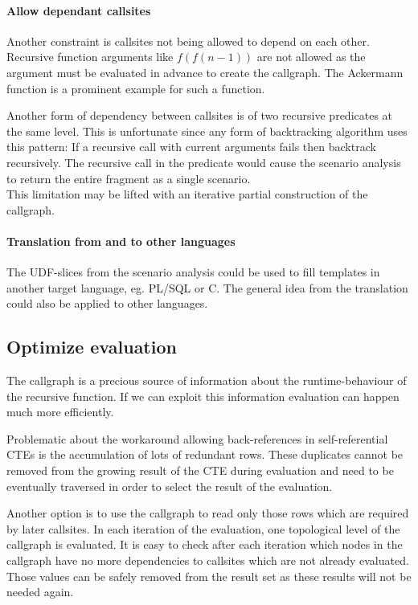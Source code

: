\paragraph*{Allow dependant callsites}
Another constraint is callsites not being allowed to depend on each other. Recursive function arguments like $f(f(n-1))$ are not allowed as the argument must be evaluated in advance to create the callgraph. The Ackermann function is a prominent example for such a function.

Another form of dependency between callsites is of two recursive predicates at the same level. This is unfortunate since any form of backtracking algorithm uses this pattern: If a recursive call with current arguments fails then backtrack recursively. The recursive call in the predicate would cause the scenario analysis to return the entire fragment as a single scenario.\\
This limitation may be lifted with an iterative partial construction of the callgraph.

\paragraph*{Translation from and to other languages}

The UDF-slices from the scenario analysis could be used to fill templates in another target language, eg. PL/SQL or C. The general idea from the translation could also be applied to other languages.

\subsection{Optimize evaluation}

The callgraph is a precious source of information about the runtime-behaviour of the recursive function. If we can exploit this information evaluation can happen much more efficiently.

Problematic about the workaround allowing back-references in self-referential CTEs is the accumulation of lots of redundant rows. These duplicates cannot be removed from the growing result of the CTE during evaluation and need to be eventually traversed in order to select the result of the evaluation.

Another option is to use the callgraph to read only those rows which are required by later callsites. In each iteration of the evaluation, one topological level of the callgraph is evaluated. It is easy to check after each iteration which nodes in the callgraph have no more dependencies to callsites which are not already evaluated. Those values can be safely removed from the result set as these results will not be needed again.

